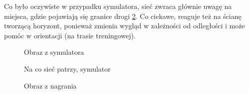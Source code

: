 Co było oczywiste w przypadku symulatora, sieć zwraca głównie uwagę na miejsca,
gdzie pojawiają się granice drogi \ref{sim_act}. Co ciekawe, reaguje też na ścianę
tworzącą horyzont, ponieważ zmienia wygląd w zależności od odległości i może
pomóc w orientacji (na trasie treningowej).
\begin{figure}
  \centering
  \caption{Obraz z symulatora}
  \label{sim_img}
\end{figure}
\begin{figure}
  \centering
  \caption{Na co sieć patrzy, symulator}
  \label{sim_act}
\end{figure}
\begin{figure}
  \centering
  \caption{Obraz z nagrania}
  \label{real_img}
\end{figure}

